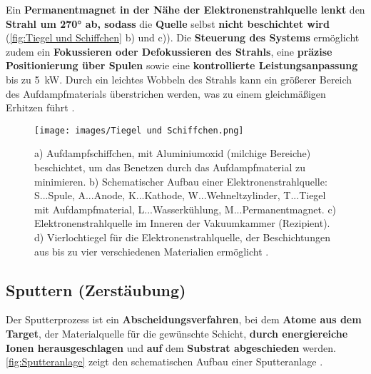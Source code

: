 \documentclass{article} %
\begin{document}
\vspace{1em}

Ein \textbf{Permanentmagnet in der Nähe der Elektronenstrahlquelle lenkt} den \textbf{Strahl um 270° ab, sodass} die \textbf{Quelle} selbst \textbf{nicht beschichtet wird} (\autoref{fig:Tiegel und Schiffchen} b) und c)). Die \textbf{Steuerung des Systems} ermöglicht zudem ein \textbf{Fokussieren oder Defokussieren des Strahls}, eine \textbf{präzise Positionierung über Spulen} sowie eine \textbf{kontrollierte Leistungsanpassung} bis zu 5~kW. Durch ein leichtes Wobbeln des Strahls kann ein größerer Bereich des Aufdampfmaterials überstrichen werden, was zu einem gleichmäßigen Erhitzen führt \cite{keplinger2024}.

\begin{figure}[htb!]
    \centering
    \texttt{[image: images/Tiegel und Schiffchen.png]} %
    \captionsetup{labelfont=bf} %
    \caption{%
    a) Aufdampfschiffchen, mit Aluminiumoxid (milchige Bereiche) beschichtet, um das Benetzen durch das Aufdampfmaterial zu minimieren. b) Schematischer Aufbau einer Elektronenstrahlquelle: S...Spule, A...Anode, K...Kathode, W...Wehneltzylinder, T...Tiegel mit Aufdampfmaterial, L...Wasserkühlung, M...Permanentmagnet. c) Elektronenstrahlquelle im Inneren der Vakuumkammer (Rezipient). d) Vierlochtiegel für die Elektronenstrahlquelle, der Beschichtungen aus bis zu vier verschiedenen Materialien ermöglicht 
    \cite{keplinger2024}.
    }
    \label{fig:Tiegel und Schiffchen}
\end{figure}





\vspace{1em}

\subsection{Sputtern (Zerstäubung)} %

Der Sputterprozess ist ein \textbf{Abscheidungsverfahren}, bei dem \textbf{Atome aus dem Target}, der Materialquelle für die gewünschte Schicht, \textbf{durch energiereiche Ionen herausgeschlagen} und \textbf{auf} dem \textbf{Substrat abgeschieden} werden. \autoref{fig:Sputteranlage} zeigt den schematischen Aufbau einer Sputteranlage \cite{keplinger2024}.
\end{document}
